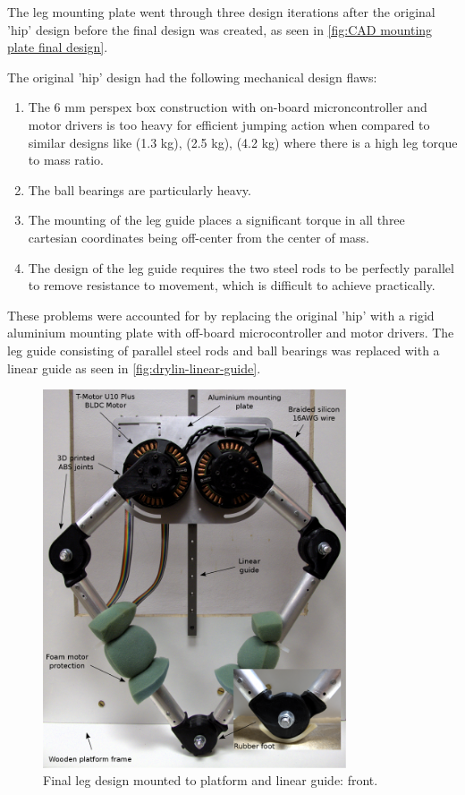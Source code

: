 The leg mounting plate went through three design iterations after the original 'hip' design before the final design was created, as seen in \cref{fig:CAD mounting plate final design}.

The original 'hip' design had the following mechanical design flaws:

\begin{enumerate}
\item The 6 mm perspex box construction with on-board microncontroller and motor drivers is too heavy for efficient jumping action when compared to similar designs like \cite{Duperret} (1.3 kg), \cite{Kalouche2016} (2.5 kg), \cite{Wang2012} (4.2 kg) where there is a high leg torque to mass ratio.
\item The ball bearings are particularly heavy.
\item The mounting of the leg guide places a significant torque in all three cartesian coordinates being off-center from the center of mass.
\item The design of the leg guide requires the two steel rods to be perfectly parallel to remove resistance to movement, which is difficult to achieve practically.
\end{enumerate}

These problems were accounted for by replacing the original 'hip' with a rigid aluminium mounting plate with off-board microcontroller and motor drivers. The leg guide consisting of parallel steel rods and ball bearings was replaced with a linear guide as seen in \cref{fig:drylin-linear-guide}.  

\begin{figure}
\centering
\includegraphics[width=0.8\textwidth]{images/mechanical/leg-mount-annotated} 
\caption{Final leg design mounted to platform and linear guide: front.}
\label{fig:Final leg design - front}
\end{figure}

